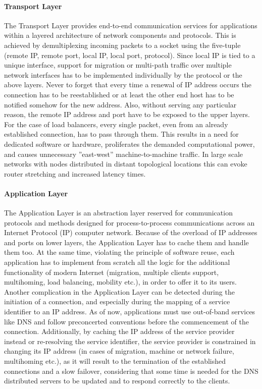 \documentclass[12pt,a4paper,oneside]{article}
\begin{document}
\paragraph{Transport Layer} The Transport Layer provides end-to-end communication services for applications within a layered architecture of network components and protocols.
This is achieved by demultiplexing incoming packets to a socket using the five-tuple (remote IP, remote port, local IP, local port, protocol).
Since local IP is tied to a unique interface, support for migration or multi-path traffic over multiple network interfaces has to be implemented individually by the protocol or the above layers.
Never to forget that every time a renewal of IP address occurs the connection has to be reestablished or at least the other end host has to be notified somehow for the new address. Also, without serving any particular reason, the remote IP address and port have to be exposed to the upper layers. \\
\indent For the case of load balancers, every single packet, even from an already established connection, has to pass through them.
This results in a need for dedicated software or hardware, proliferates the demanded computational power, and causes unnecessary ''east-west'' machine-to-machine traffic. In large scale networks with nodes distributed in distant topological locations this can evoke router stretching and increased latency times.
\paragraph{Application Layer}  The Application Layer is an abstraction layer reserved for communication protocols and methods designed for process-to-process communications across an Internet Protocol (IP) computer network.
Because of the overload of IP addresses and ports on lower layers, the Application Layer has to cache them and handle them too.
At the same time, violating the principle of software reuse, each application has to implement from scratch all the logic for the additional functionality of modern Internet (migration, multiple clients support, multihoming, load balancing, mobility etc.), in order to offer it to its users.\\
\indent Another complication in the Application Layer can be detected during the initiation of a connection, and especially during the mapping of a service identifier to an IP address.
As of now, applications must use out-of-band services like DNS and follow preconcerted conventions before the commencement of the connection.
Additionally, by caching the IP address of the service provider instead or re-resolving the service identifier, the service provider is constrained in changing its IP address (in cases of migration, machine or network failure, multihoming etc.), as it will result to the termination of the established connections and a slow failover, considering that some time is needed for the DNS distributed servers to be updated and to respond correctly to the clients.
\end{document}
